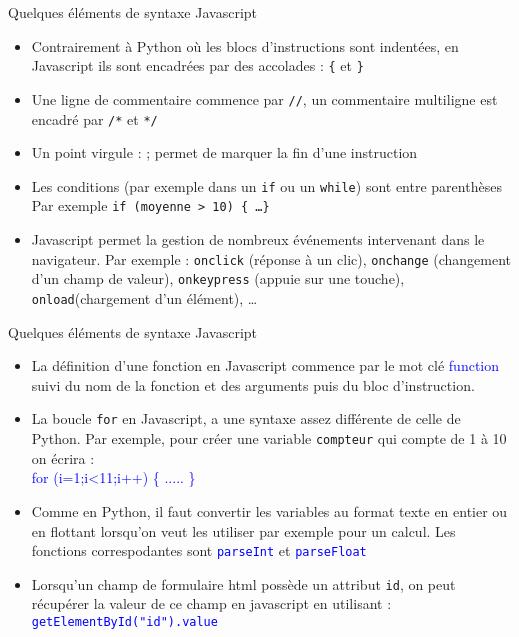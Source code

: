 \documentclass[10pt]{beamer}
\begin{document}
\begin{frame}
\mframe{\JS}
\begin{block}{Quelques éléments de syntaxe Javascript}
\begin{itemize}
\item<1-> Contrairement à Python où les blocs d'instructions sont indentées, en Javascript ils sont encadrées par des accolades : \texttt{\{} et \texttt{\}}
\item<2-> Une ligne de commentaire commence par \texttt{//}, un commentaire multiligne est encadré par \texttt{/*} et \texttt{*/} 
\item<3-> Un point virgule : ; permet de marquer la fin d'une instruction
\item<4-> Les conditions (par exemple dans un \texttt{if} ou un \texttt{while}) sont entre parenthèses \\
Par exemple \texttt{if (moyenne > 10) \{ \dots\}}
\item<5-> Javascript permet la gestion de nombreux événements intervenant dans le navigateur. Par exemple : \texttt{onclick} (réponse à un clic), \texttt{onchange} (changement d'un champ de valeur), \texttt{onkeypress} (appuie sur une touche), \texttt{onload}(chargement d'un élément), \dots 
\end{itemize}
\end{block}
\end{frame}


\begin{frame}
\mframe{\JS}
\begin{block}{Quelques éléments de syntaxe Javascript}
\begin{itemize}
\item<1-> La définition d'une fonction en Javascript commence par le mot clé \textcolor{blue}{function} suivi du nom de la fonction et des arguments puis du bloc d'instruction.
\item<2-> La boucle {\tt for} en Javascript, a une syntaxe assez différente de celle de Python. Par exemple, pour créer une variable {\tt compteur} qui compte de 1 à 10 on écrira : \\
\textcolor{blue}{for (i=1;i<11;i++) \{ ..... \}}
\item<3-> Comme en Python, il faut convertir les variables au format texte en entier ou en flottant lorsqu'on veut les utiliser par exemple pour un calcul. Les fonctions correspodantes sont \textcolor{blue}{\tt parseInt} et \textcolor{blue}{\tt parseFloat}
\item<4-> Lorsqu'un champ de formulaire {\sc html} possède un attribut {\tt id}, on peut récupérer la valeur de ce champ en javascript en utilisant : \\
\textcolor{blue}{\tt getElementById("id").value}
\end{itemize}
\end{block}
\end{frame}
\end{document}
